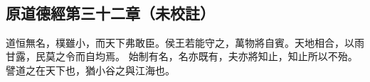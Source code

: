 ﻿%
%

\chapter{~}

\section{原道德經第三十二章（未校註）}

\begin{withgezhu}

\zhsong


道恒無名，樸雖小，而天下弗敢臣。侯王若能守之，萬物將自賓。天地相合，以雨甘露，民莫之令而自均焉。
始制有名，名亦既有，夫亦將知止，知止所以不殆。
譬道之在天下也，\textcolor{tongjia-color}{猶小谷之與江海也}。

\end{withgezhu}
